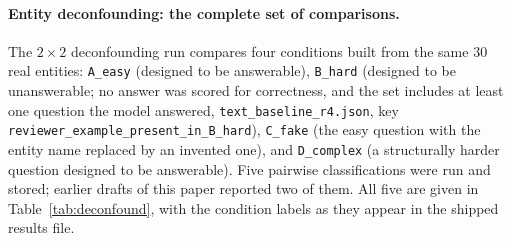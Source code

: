 \documentclass[11pt,a4paper]{article}
\begin{document}
\paragraph{Entity deconfounding: the complete set of comparisons.}
The $2\times2$ deconfounding run compares four conditions built from the
same 30 real entities: \texttt{A\_easy} (designed to be answerable),
\texttt{B\_hard} (designed to be unanswerable; no answer was scored for correctness, and the set includes at least one question the model answered, \texttt{text\_baseline\_r4.json}, key \texttt{reviewer\_\allowbreak example\_\allowbreak present\_\allowbreak in\_\allowbreak B\_hard}),
\texttt{C\_fake} (the easy question with the entity name replaced by an
invented one), and \texttt{D\_complex} (a structurally harder question designed to be answerable). Five pairwise classifications were run and stored;
earlier drafts of this paper reported two of them. All five are given in
Table~\ref{tab:deconfound}, with the condition labels as they appear in the
shipped results file.
\end{document}
